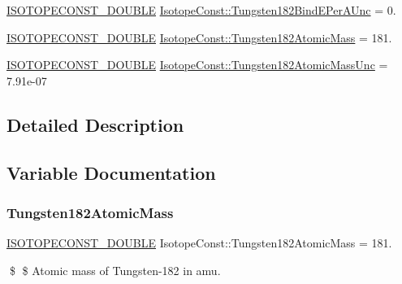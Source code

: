 \begin{DoxyCompactItemize}
\mbox{\hyperlink{group___isotope_const-_macros_ga8f45a7272ce02c0b4c65c44636ed719a}{I\+S\+O\+T\+O\+P\+E\+C\+O\+N\+S\+T\+\_\+\+D\+O\+U\+B\+LE}} \mbox{\hyperlink{group___isotope_const-_tungsten-_w182_ga6871676eaf3bf410c358ef86bdbac396}{Isotope\+Const\+::\+Tungsten182\+Bind\+E\+Per\+A\+Unc}} = 0.
\item 
\mbox{\hyperlink{group___isotope_const-_macros_ga8f45a7272ce02c0b4c65c44636ed719a}{I\+S\+O\+T\+O\+P\+E\+C\+O\+N\+S\+T\+\_\+\+D\+O\+U\+B\+LE}} \mbox{\hyperlink{group___isotope_const-_tungsten-_w182_ga02823c23da01cb17e1cdb3c71fd5952b}{Isotope\+Const\+::\+Tungsten182\+Atomic\+Mass}} = 181.
\item 
\mbox{\hyperlink{group___isotope_const-_macros_ga8f45a7272ce02c0b4c65c44636ed719a}{I\+S\+O\+T\+O\+P\+E\+C\+O\+N\+S\+T\+\_\+\+D\+O\+U\+B\+LE}} \mbox{\hyperlink{group___isotope_const-_tungsten-_w182_ga013dd359d02385916c9a7ab21f048395}{Isotope\+Const\+::\+Tungsten182\+Atomic\+Mass\+Unc}} = 7.\+91e-\/07
\end{DoxyCompactItemize}


\subsection{Detailed Description}


\subsection{Variable Documentation}
\mbox{\label{group___isotope_const-_tungsten-_w182_ga02823c23da01cb17e1cdb3c71fd5952b}} 
\subsubsection{\texorpdfstring{Tungsten182\+Atomic\+Mass}{Tungsten182AtomicMass}}
{\footnotesize\ttfamily \mbox{\hyperlink{group___isotope_const-_macros_ga8f45a7272ce02c0b4c65c44636ed719a}{I\+S\+O\+T\+O\+P\+E\+C\+O\+N\+S\+T\+\_\+\+D\+O\+U\+B\+LE}} Isotope\+Const\+::\+Tungsten182\+Atomic\+Mass = 181.}

\$ \$ Atomic mass of Tungsten-\/182 in amu. \mbox{\label{group___isotope_const-_tungsten-_w182_ga013dd359d02385916c9a7ab21f048395}} 
